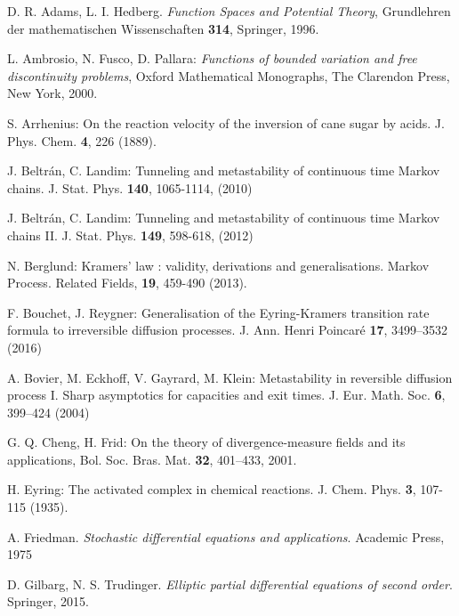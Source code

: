 \documentclass[reqno]{amsart}
\newcounter{as}[section]
\newcommand{\<}{\langle}
\renewcommand{\>}{\rangle}
\begin{document}
\begin{thebibliography}{99}

 D. R. Adams, L. I. Hedberg. {\sl Function Spaces and Potential Theory}, Grundlehren der mathematischen Wissenschaften {\bf 314}, Springer, 1996.

 L. Ambrosio, N. Fusco, D. Pallara: {\sl Functions of bounded variation and free discontinuity problems}, Oxford Mathematical Monographs, The Clarendon Press, New York, 2000.

 S. Arrhenius: On the reaction velocity of the inversion of cane sugar by acids.  J. Phys. Chem. {\bf 4}, 226 (1889).

 J. Beltr\'{a}n, C. Landim: Tunneling and metastability
  of continuous time Markov chains. J. Stat. Phys. {\bf 140},
  1065-1114, (2010)

 J. Beltr\'{a}n, C. Landim: Tunneling and metastability
  of continuous time Markov chains II. J. Stat. Phys. {\bf 149},
  598-618, (2012)

 N. Berglund: Kramers' law : validity, derivations and
 generalisations. Markov Process. Related Fields, {\bf 19}, 459-490 (2013).

 F. Bouchet, J. Reygner: Generalisation of the
  Eyring-Kramers transition rate formula to irreversible diffusion
  processes. J. Ann. Henri Poincar\'e {\bf 17}, 3499--3532 (2016)

 A. Bovier, M. Eckhoff, V. Gayrard, M. Klein:
  Metastability in reversible diffusion process I. Sharp asymptotics
  for capacities and exit times. J. Eur. Math. Soc. {\bf 6}, 399--424
  (2004)

 G. Q. Cheng, H. Frid: On the theory of divergence-measure
  fields and its applications, Bol. Soc. Bras.  Mat. {\bf 32},
  401--433, 2001.


 H. Eyring: The activated complex in chemical
  reactions. J. Chem. Phys. {\bf 3}, 107-115 (1935).

 A. Friedman. {\sl Stochastic differential equations and
    applications}. Academic Press, 1975

 D. Gilbarg, N. S. Trudinger. {\sl Elliptic partial
    differential equations of second order}. Springer, 2015.


\end{thebibliography}
\end{document}
